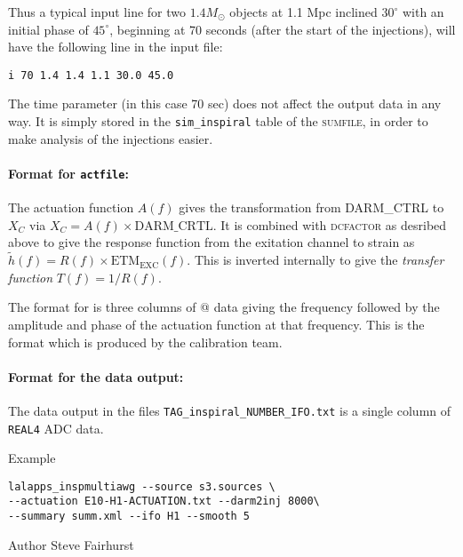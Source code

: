 \begin{entry}
Thus a typical input line for two $1.4M_\odot$ objects at 1.1 Mpc
inclined $30^\circ$ with an initial phase of $45^\circ$, beginning at
70 seconds (after the start of the injections), will have the following line in the input
file:
\begin{verbatim}
i 70 1.4 1.4 1.1 30.0 45.0
\end{verbatim}
The time parameter (in this case 70 sec) does not affect the output data in any
way.  It is simply stored in the \texttt{sim\_inspiral} table of the
\textsc{sumfile}, in order to make analysis of the injections easier.

\paragraph{Format for \texttt{actfile}:} The actuation function $A(f)$
gives the transformation from DARM\_CTRL to $X_{C}$ via $X_{C} = A(f) 
\times \mathrm{DARM}\_\mathrm{CRTL}$.   It is combined with
\textsc{dcfactor} as desribed above to give the response function from
the exitation channel to strain as
$\tilde{h}(f)=R(f) \times \mathrm{ETM}_\mathrm{EXC}(f)$.  This is inverted internally 
to give the \emph{transfer function} $T(f)=1/R(f)$. 

The format for \verb@actfile@ is three columns of @ data giving the 
frequency followed by the amplitude and phase of the actuation function
at that frequency.  This is the format which is produced by the
calibration team.

\paragraph{Format for the data output:} The data output in the files
\verb$TAG_inspiral_NUMBER_IFO.txt$ is a single column of \verb$REAL4$ ADC data.

\item[Example]
\begin{verbatim}
lalapps_inspmultiawg --source s3.sources \
--actuation E10-H1-ACTUATION.txt --darm2inj 8000\ 
--summary summ.xml --ifo H1 --smooth 5
\end{verbatim}

\item[Author] 
Steve Fairhurst
\end{entry}

